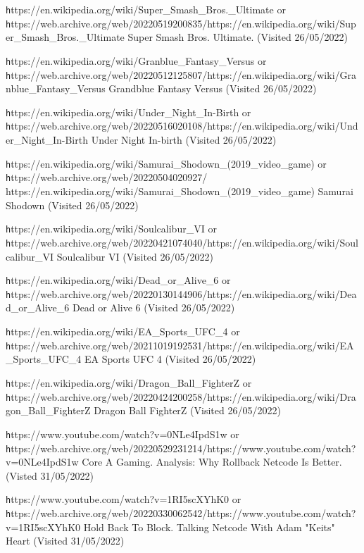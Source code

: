 \documentclass{entcs}
\begin{document}
\begin{thebibliography}{25}
 {\texttt https://en.wikipedia.org/wiki/Super\_Smash\_Bros.\_Ultimate} or {\texttt https://web.archive.org/web/20220519200835/https://en.wikipedia.org/wiki/Super\_Smash\_Bros.\_Ultimate} Super Smash Bros. Ultimate. (Visited 26/05/2022)

 {\texttt https://en.wikipedia.org/wiki/Granblue\_Fantasy\_Versus} or {\texttt https://web.archive.org/web/20220512125807/https://en.wikipedia.org/wiki/Granblue\_Fantasy\_Versus} Grandblue Fantasy Versus (Visited 26/05/2022)

 {\texttt https://en.wikipedia.org/wiki/Under\_Night\_In-Birth} or {\texttt https://web.archive.org/web/20220516020108/https://en.wikipedia.org/wiki/Under\_Night\_In-Birth} Under Night In-birth (Visited 26/05/2022)

 {\texttt https://en.wikipedia.org/wiki/Samurai\_Shodown\_(2019\_video\_game)} or {\texttt https://web.archive.org/web/20220504020927/
https://en.wikipedia.org/wiki/Samurai\_Shodown\_(2019\_video\_game)} Samurai Shodown (Visited 26/05/2022)

 {\texttt https://en.wikipedia.org/wiki/Soulcalibur\_VI} or {\texttt https://web.archive.org/web/20220421074040/https://en.wikipedia.org/wiki/Soulcalibur\_VI} Soulcalibur VI (Visited 26/05/2022)

 {\texttt https://en.wikipedia.org/wiki/Dead\_or\_Alive\_6} or {\texttt https://web.archive.org/web/20220130144906/https://en.wikipedia.org/wiki/Dead\_or\_Alive\_6} Dead or Alive 6 (Visited 26/05/2022)

 {\texttt https://en.wikipedia.org/wiki/EA\_Sports\_UFC\_4} or {\texttt https://web.archive.org/web/20211019192531/https://en.wikipedia.org/wiki/EA\_Sports\_UFC\_4} EA Sports UFC 4 (Visited 26/05/2022)

 {\texttt https://en.wikipedia.org/wiki/Dragon\_Ball\_FighterZ} or {\texttt https://web.archive.org/web/20220424200258/https://en.wikipedia.org/wiki/Dragon\_Ball\_FighterZ} Dragon Ball FighterZ (Visited 26/05/2022)

 {\texttt https://www.youtube.com/watch?v=0NLe4IpdS1w} or {\texttt https://web.archive.org/web/20220529231214/https://www.youtube.com/watch?v=0NLe4IpdS1w} Core A Gaming. Analysis: Why Rollback Netcode Is Better. (Visted 31/05/2022)

 {\texttt https://www.youtube.com/watch?v=1RI5scXYhK0} or {\texttt https://web.archive.org/web/20220330062542/https://www.youtube.com/watch?v=1RI5scXYhK0} Hold Back To Block. Talking Netcode With Adam "Keits" Heart (Visited 31/05/2022)


\end{thebibliography}
\end{document}
